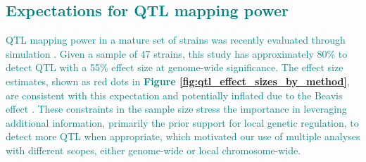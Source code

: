 \documentclass[9pt,twocolumn,twoside]{gsajnl}
\newcommand{\WV}[2]{\textcolor{red}{#1\footnote{\textcolor{red}{WV: #2}}}}
\newcommand{\GKinline}[1]{\textcolor{teal}{#1}}
\begin{document}
\subsection{\GKinline{Expectations for QTL mapping power}}

\GKinline{QTL mapping power in a mature set of strains was recently evaluated through simulation \citep{Keele2019}. Given a sample of 47 strains, this study has approximately 80\% to detect QTL with a 55\% effect size at genome-wide significance. The effect size estimates, shown as red dots in \textbf{Figure \ref{fig:qtl_effect_sizes_by_method}}, are consistent with this expectation and potentially inflated due to the Beavis effect \citep{Xu2003}. These constraints in the sample size stress the importance in leveraging additional information, primarily the prior support for local genetic regulation, to detect more QTL when appropriate, which motivated our use of multiple analyses with different scopes, either genome-wide or local chromosome-wide.}

%

\end{document}
